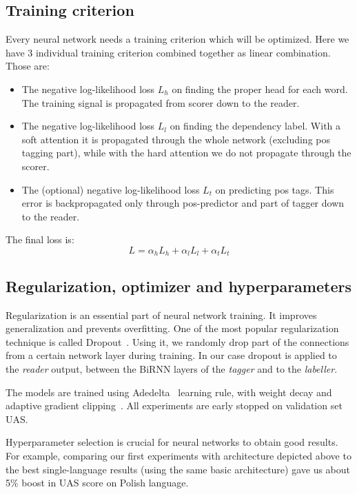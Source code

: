 \subsection{Training criterion}
Every neural network needs a training criterion which will be optimized.
Here we have 3 individual training criterion combined together as linear
combination. Those are:
\begin{itemize}
        \item The negative log-likelihood loss $L_h$ on finding the proper head for each
            word. The training signal is propagated from scorer down to the reader.
        \item The negative log-likelihood loss $L_l$ on finding the dependency label.
            With a soft attention it is propagated through the whole network (excluding
            pos tagging part), while with the hard attention we do not propagate
            through the scorer.
        \item The (optional) negative log-likelihood loss $L_t$ on predicting pos tags.
            This error is backpropagated only through pos-predictor and part of tagger
            down to the reader.
\end{itemize}
The final loss is:
\begin{equation}\label{eq:neural_loss}
    L = \alpha_hL_h + \alpha_lL_l + \alpha_tL_t
\end{equation}

\subsection{Regularization, optimizer and hyperparameters} \label{sec:basic_params}
Regularization is an essential part of  neural network training. It improves 
generalization and prevents overfitting. One of the most popular regularization
technique is called Dropout~\cite{srivastava_dropout:_2014}. Using it, we randomly
drop part of the connections from a certain network layer during training.
In our case dropout is applied to the \emph{reader} output, between the BiRNN
layers of the \emph{tagger} and to the \emph{labeller}.

The models are trained using Adedelta~\cite{zeiler_adadelta:_2012} learning rule,
with weight decay and adaptive gradient clipping~\cite{chorowski_end--end_2014}.
All experiments are early stopped on validation set UAS.

Hyperparameter selection is crucial for neural networks to obtain good results.
For example, comparing our first experiments with architecture depicted above to
the best single-language results (using the same basic architecture) gave us
about 5\% boost in UAS score on Polish language.


